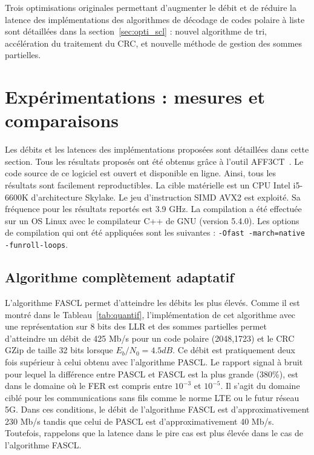 Trois optimisations originales permettant d'augmenter le débit et de réduire la latence des implémentations des algorithmes de décodage de codes polaire à liste sont détaillées dans la section~\ref{sec:opti_scl} : nouvel algorithme de tri, accélération du traitement du CRC, et nouvelle méthode de gestion des sommes partielles.




\section{Expérimentations : mesures et comparaisons}
\label{sec:exp_scl}

Les débits et les latences des implémentations proposées sont détaillées dans cette section. Tous les résultats proposés ont été obtenus grâce à l'outil AFF3CT~\cite{cassagne_fast_2017}. Le code source de ce logiciel est ouvert et disponible en ligne. Ainsi, tous les résultats sont facilement reproductibles. La cible matérielle est un CPU Intel i5-6600K d'architecture Skylake. Le jeu d'instruction SIMD AVX2 est exploité. Sa fréquence pour les résultats reportés est 3.9 GHz. La compilation a été effectuée sur un OS Linux avec le compilateur C++ de GNU (version 5.4.0). Les options de compilation qui ont été appliquées sont les suivantes : \texttt{-Ofast -march=native -funroll-loops}.

\subsection{Algorithme complètement adaptatif}
L'algorithme FASCL permet d'atteindre les débits les plus élevés. Comme il est montré dans le Tableau~\ref{tab:quantif}, l'implémentation de cet algorithme avec une représentation sur 8 bits des LLR et des sommes partielles permet d'atteindre un débit de 425 Mb/s pour un code polaire (2048,1723) et le CRC GZip de taille 32 bits lorsque $E_b/N_0=4.5dB$. Ce débit est pratiquement deux fois supérieur à celui obtenu avec l'algorithme PASCL. Le rapport signal à bruit pour lequel la différence entre PASCL et FASCL est la plus grande (380\%), est dans le domaine où le FER est compris entre $10^{-3}$ et $10^{-5}$. Il s'agit du domaine ciblé pour les communications sans fils comme le norme LTE ou le futur réseau 5G. Dans ces conditions, le débit de l'algorithme FASCL est d'approximativement 230 Mb/s tandis que celui de PASCL est d'approximativement 40 Mb/s. Toutefois, rappelons que la latence dans le pire cas est plus élevée dans le cas de l'algorithme FASCL.

